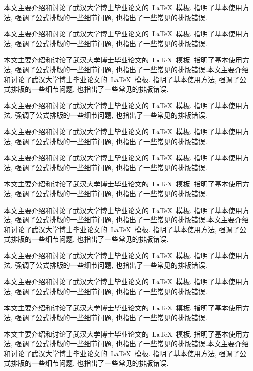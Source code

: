 \begin{enabstract}
本文主要介绍和讨论了武汉大学博士毕业论文的~\LaTeX~模板.
指明了基本使用方法, 强调了公式排版的一些细节问题, 也指出了一些常见的排版错误.

本文主要介绍和讨论了武汉大学博士毕业论文的~\LaTeX~模板.
指明了基本使用方法, 强调了公式排版的一些细节问题, 也指出了一些常见的排版错误.

本文主要介绍和讨论了武汉大学博士毕业论文的~\LaTeX~模板.
指明了基本使用方法, 强调了公式排版的一些细节问题, 也指出了一些常见的排版错误.本文主要介绍和讨论了武汉大学博士毕业论文的~\LaTeX~模板.
指明了基本使用方法, 强调了公式排版的一些细节问题, 也指出了一些常见的排版错误.

本文主要介绍和讨论了武汉大学博士毕业论文的~\LaTeX~模板.
指明了基本使用方法, 强调了公式排版的一些细节问题, 也指出了一些常见的排版错误.

本文主要介绍和讨论了武汉大学博士毕业论文的~\LaTeX~模板.
指明了基本使用方法, 强调了公式排版的一些细节问题, 也指出了一些常见的排版错误.

本文主要介绍和讨论了武汉大学博士毕业论文的~\LaTeX~模板.
指明了基本使用方法, 强调了公式排版的一些细节问题, 也指出了一些常见的排版错误.

本文主要介绍和讨论了武汉大学博士毕业论文的~\LaTeX~模板.
指明了基本使用方法, 强调了公式排版的一些细节问题, 也指出了一些常见的排版错误.

本文主要介绍和讨论了武汉大学博士毕业论文的~\LaTeX~模板.
指明了基本使用方法, 强调了公式排版的一些细节问题, 也指出了一些常见的排版错误.本文主要介绍和讨论了武汉大学博士毕业论文的~\LaTeX~模板.
指明了基本使用方法, 强调了公式排版的一些细节问题, 也指出了一些常见的排版错误.


本文主要介绍和讨论了武汉大学博士毕业论文的~\LaTeX~模板.
指明了基本使用方法, 强调了公式排版的一些细节问题, 也指出了一些常见的排版错误.

本文主要介绍和讨论了武汉大学博士毕业论文的~\LaTeX~模板.
指明了基本使用方法, 强调了公式排版的一些细节问题, 也指出了一些常见的排版错误.

本文主要介绍和讨论了武汉大学博士毕业论文的~\LaTeX~模板.
指明了基本使用方法, 强调了公式排版的一些细节问题, 也指出了一些常见的排版错误.

本文主要介绍和讨论了武汉大学博士毕业论文的~\LaTeX~模板.
指明了基本使用方法, 强调了公式排版的一些细节问题, 也指出了一些常见的排版错误.本文主要介绍和讨论了武汉大学博士毕业论文的~\LaTeX~模板.
指明了基本使用方法, 强调了公式排版的一些细节问题, 也指出了一些常见的排版错误.




\end{enabstract}
